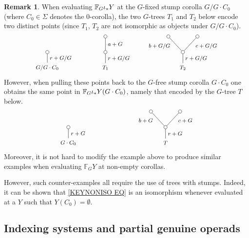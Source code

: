 \documentclass[a4paper,10pt
,draft
]{article}%
\numberwithin{equation}{section}
\numberwithin{figure}{section}
\theoremstyle{definition} %
\newtheorem{remark}[equation]{Remark}%
\newcommand{\F}{\ensuremath{\mathcal F}}
\newcommand{\1}{\ensuremath{\mathbbm 1}}%
\begin{document}
\begin{remark}
	When evaluating $\mathbb{F}_G \iota_{\**} Y$ at the $G$-fixed stump corolla $G/G \cdot C_0$ 
	(where $C_0 \in \Sigma$ denotes the $0$-corolla),
	 the two $G$-trees $T_1$ and $T_2$ below encode two distinct points (since $T_1$, $T_2$ are not isomorphic as objects under $G/G\cdot C_0$).
\[
\begin{tikzpicture}[grow=up,auto,level distance=2.3em,every node/.style = {font=\footnotesize},dummy/.style={circle,draw,inner sep=0pt,minimum size=1.75mm}]
	\node at (0,0) {$G/G \cdot C_0$}
		child{
			node [dummy] {}
		edge from parent node [swap] {$r+G/G$}};
	\node at (3,0) {$T_1$}
		child{node [dummy] {}
			child{node [dummy] {}
			edge from parent node [swap] {$a+G$}}
		edge from parent node [swap] {$r+G/G$}};
	\node at (7,0) {$T_2$}
		child{node [dummy] {}
			child{node [dummy] {}
			edge from parent node [swap,near end] {$c+G/G$}}
			child{node [dummy] {}
			edge from parent node [near end] {$b+G/G$}}
		edge from parent node [swap] {$r+G/G$}};
\end{tikzpicture}
\]
However, when pulling these points back to the $G$-free stump corolla $G \cdot C_0$ one obtains the same point in 
$\mathbb F_G \iota_{\**} Y(G \cdot C_0)$,
namely that encoded by the $G$-tree $T$ below.
\[
\begin{tikzpicture}[grow=up,auto,level distance=2.3em,every node/.style = {font=\footnotesize},dummy/.style={circle,draw,inner sep=0pt,minimum size=1.75mm}]
	\node at (0,0) {$G \cdot C_0$}
		child{
			node [dummy] {}
		edge from parent node [swap] {$r+G$}};
	\node at (5,0) {$T$}
		child{node [dummy] {}
			child{node [dummy] {}
			edge from parent node [swap,near end] {$c+G$}}
			child{node [dummy] {}
			edge from parent node [near end] {$b+G$}}
		edge from parent node [swap] {$r+G$}};
\end{tikzpicture}
\]
Moreover, it is not hard to modify the example above to produce similar examples when evaluating $\mathbb{F}_GY$ at non-empty corollas. 

However, such counter-examples all require the use of trees with stumps. Indeed, it can be shown that \eqref{KEYNONISO EQ}
is an isomorphism whenever evaluated at a $Y$ such that $Y(C_0)=\emptyset$.
\end{remark}


\renewcommand{\F}{\mathcal{F}}

\subsection{Indexing systems and partial genuine operads}
\label{INDEXING_SECTION}
\end{document}
